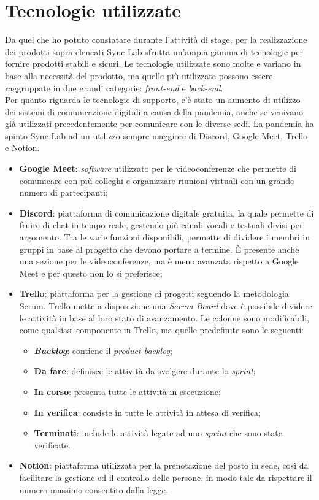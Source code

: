 \section{Tecnologie utilizzate}
Da quel che ho potuto constatare durante l'attività di stage, per la realizzazione dei prodotti sopra elencati Sync Lab sfrutta un'ampia gamma di tecnologie per fornire prodotti stabili e sicuri. Le tecnologie utilizzate sono molte e variano in base alla necessità del prodotto, ma quelle più utilizzate possono essere raggruppate in due grandi categorie: \textit{front-end} e \textit{back-end}. \\

Per quanto riguarda le tecnologie di supporto, c'è stato un aumento di utilizzo dei sistemi di comunicazione digitali a causa della pandemia, anche se venivano già utilizzati precedentemente per comunicare con le diverse sedi. La pandemia ha spinto Sync Lab ad un utilizzo sempre maggiore di Discord, Google Meet, Trello e Notion.

\begin{itemize}
  \item \textbf{Google Meet}: \textit{software} utilizzato per le videoconferenze che permette di comunicare con più colleghi e organizzare riunioni virtuali con un grande numero di partecipanti;
  \item \textbf{Discord}: piattaforma di comunicazione digitale gratuita, la quale permette di fruire di chat in tempo reale, gestendo più canali vocali e testuali divisi per argomento. Tra le varie funzioni disponibili, permette di dividere i membri in gruppi in base al progetto che devono portare a termine. È presente anche una sezione per le videoconferenze, ma è meno avanzata rispetto a Google Meet e per questo non lo si preferisce;
  \item \textbf{Trello}: piattaforma per la gestione di progetti seguendo la metodologia Scrum. Trello mette a disposizione una \textit{Scrum Board} dove è possibile dividere le attività in base al loro stato di avanzamento. Le colonne sono modificabili, come qualsiasi componente in Trello, ma quelle predefinite sono le seguenti:
  \begin{itemize}
    \item \textbf{\textit{Backlog}}: contiene il \textit{product backlog};
    \item \textbf{Da fare}: definisce le attività da svolgere durante lo \textit{sprint};
    \item \textbf{In corso}: presenta tutte le attività in esecuzione;
    \item \textbf{In verifica}: consiste in tutte le attività in attesa di verifica;
    \item \textbf{Terminati}: include le attività legate ad uno \textit{sprint} che sono state verificate. 
  \end{itemize}
  \item \textbf{Notion}: piattaforma utilizzata per la prenotazione del posto in sede, così da facilitare la gestione ed il controllo delle persone, in modo tale da rispettare il numero massimo consentito dalla legge.
\end{itemize}

